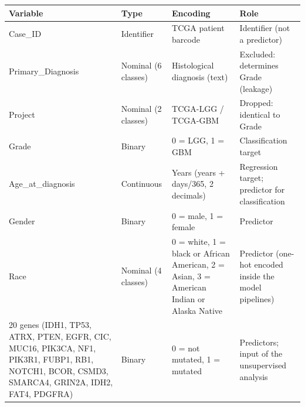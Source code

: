 \begin{tabular}{p{3.2cm}p{2.4cm}p{4.6cm}p{4.2cm}}
\toprule
\textbf{Variable} & \textbf{Type} & \textbf{Encoding} & \textbf{Role} \\
\midrule
Case\_ID & Identifier & TCGA patient barcode & Identifier (not a predictor) \\
Primary\_Diagnosis & Nominal (6 classes) & Histological diagnosis (text) & Excluded: determines Grade (leakage) \\
Project & Nominal (2 classes) & TCGA-LGG / TCGA-GBM & Dropped: identical to Grade \\
Grade & Binary & 0 = LGG, 1 = GBM & Classification target \\
Age\_at\_diagnosis & Continuous & Years (years + days/365, 2 decimals) & Regression target; predictor for classification \\
Gender & Binary & 0 = male, 1 = female & Predictor \\
Race & Nominal (4 classes) & 0 = white, 1 = black or African American, 2 = Asian, 3 = American Indian or Alaska Native & Predictor (one-hot encoded inside the model pipelines) \\
20 genes (IDH1, TP53, ATRX, PTEN, EGFR, CIC, MUC16, PIK3CA, NF1, PIK3R1, FUBP1, RB1, NOTCH1, BCOR, CSMD3, SMARCA4, GRIN2A, IDH2, FAT4, PDGFRA) & Binary & 0 = not mutated, 1 = mutated & Predictors; input of the unsupervised analysis \\
\bottomrule
\end{tabular}

